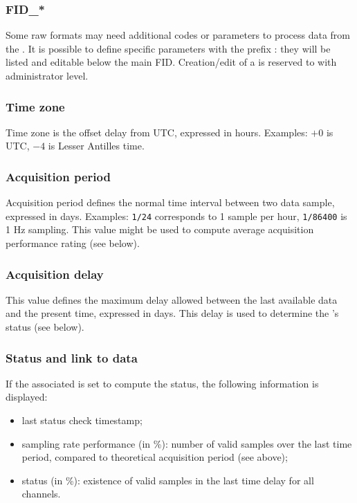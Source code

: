 \subsubsection{FID\_*}

Some raw formats may need additional codes or parameters to process data from the . It is possible to define specific parameters with the prefix : they will be listed and editable below the main FID. Creation/edit of a  is reserved to  with administrator level.


\subsubsection{Time zone}

Time zone is the offset delay from UTC, expressed in hours. Examples: $+0$ is UTC, $-4$ is Lesser Antilles time.

\subsubsection{Acquisition period}

Acquisition period defines the normal time interval between two data sample, expressed in days. Examples: \texttt{1/24} corresponds to 1 sample per hour, \texttt{1/86400} is 1 Hz sampling. This value might be used to compute average acquisition performance rating (see below).

\subsubsection{Acquisition delay}

This value defines the maximum delay allowed between the last available data and the present time, expressed in days. This delay is used to determine the 's status (see below).

\subsubsection{Status and link to data}

If the associated  is set to compute the  status, the following information is displayed:
\begin{itemize}
\item last status check timestamp;
\item sampling rate performance (in \%): number of valid samples over the last time period, compared to theoretical acquisition period (see above);
\item status (in \%): existence of valid samples in the last time delay for all channels.
\end{itemize}

